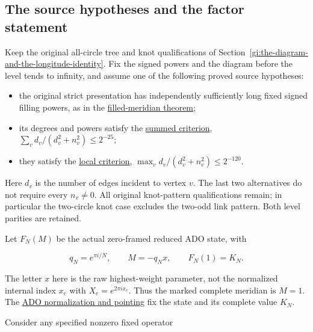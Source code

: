 \subsection{The source hypotheses and the factor statement}\label{gi:the-source-hypotheses-and-the-factor-statement}

Keep the original all-circle tree and knot qualifications of Section~\ref{gi:the-diagram-and-the-longitude-identity}.
Fix the signed powers and the diagram before the level tends to
infinity, and assume one of the following proved source hypotheses:

\begin{itemize}

\item
  the original strict presentation has independently sufficiently long
  fixed signed filling powers, as in the
  \href{https://sashakolpakov.github.io/murakamis_dream/notes/actual_main_meridian_filled_volume.html}{filled-meridian theorem};
\item
  its degrees and powers satisfy the
  \href{https://sashakolpakov.github.io/murakamis_dream/notes/actual_all_circle_quantitative_volume.html}{summed criterion},
  \(\sum_v d_v/(d_v^2+n_v^2)\le2^{-25}\);
\item
  they satisfy the
  \href{https://sashakolpakov.github.io/murakamis_dream/notes/actual_all_circle_local_message_volume.html}{local criterion},
  \(\max_v d_v/(d_v^2+n_v^2)\le2^{-120}\).
\end{itemize}

Here \(d_v\) is the number of edges incident to vertex \(v\).
The last two alternatives do not require every \(n_v\ne0\).
All original knot-pattern qualifications remain; in particular the
two-circle knot case excludes the two-odd link pattern. Both level
parities are retained.

Let \(F_N(M)\) be the actual zero-framed reduced ADO state, with

\begin{equation}\label{gi:O1}
q_N=e^{\pi i/N},\qquad M=-q_Nx,\qquad F_N(1)=K_N.
\end{equation}

The letter \(x\) here is the raw highest-weight parameter, not the
normalized internal index \(x_e\) with \(X_e=e^{2\pi ix_e}\).
Thus the marked complete meridian is \(M=1\). The
\href{https://sashakolpakov.github.io/murakamis_dream/notes/kashaev_ado_pointing.html}{ADO normalization and pointing} fix the
state and its complete value \(K_N\).

Consider any specified nonzero fixed operator

